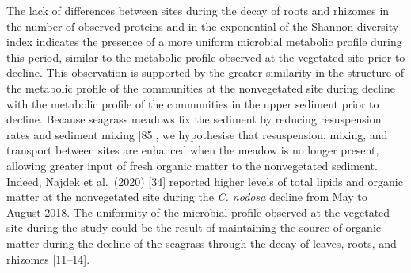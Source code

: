 \documentclass[
  12 pt,
]{article}
\begin{document}
The lack of differences between sites during the decay of roots and rhizomes in the number of observed proteins and in the exponential of the Shannon diversity index indicates the presence of a more uniform microbial metabolic profile during this period, similar to the metabolic profile observed at the vegetated site prior to decline. This observation is supported by the greater similarity in the structure of the metabolic profile of the communities at the nonvegetated site during decline with the metabolic profile of the communities in the upper sediment prior to decline. Because seagrass meadows fix the sediment by reducing resuspension rates and sediment mixing {[}85{]}, we hypothesise that resuspension, mixing, and transport between sites are enhanced when the meadow is no longer present, allowing greater input of fresh organic matter to the nonvegetated sediment. Indeed, Najdek et al.~(2020) {[}34{]} reported higher levels of total lipids and organic matter at the nonvegetated site during the \emph{C. nodosa} decline from May to August 2018. The uniformity of the microbial profile observed at the vegetated site during the study could be the result of maintaining the source of organic matter during the decline of the seagrass through the decay of leaves, roots, and rhizomes {[}11--14{]}.
\end{document}
